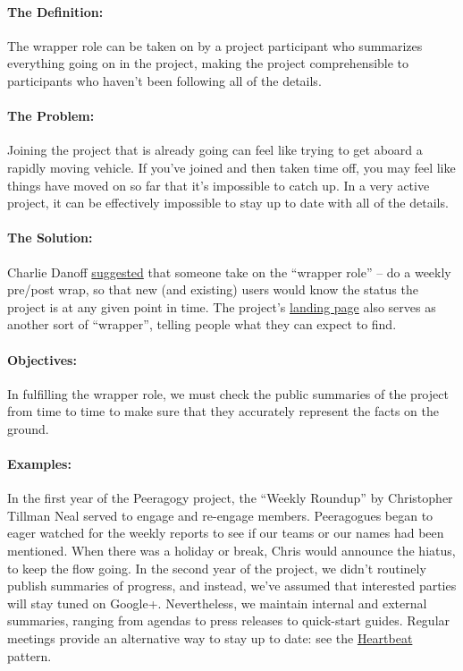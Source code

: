 \paragraph{The Definition:} The wrapper role can be taken on by a project
participant who summarizes everything going on in the project, making
the project comprehensible to participants who haven't been following
all of the details.

\paragraph{The Problem:} Joining the project that is already going can feel
like trying to get aboard a rapidly moving vehicle. If you've joined and
then taken time off, you may feel like things have moved on so far that
it's impossible to catch up. In a very active project, it can be
effectively impossible to stay up to date with all of the details.

\paragraph{The Solution:} Charlie
Danoff \href{http://socialmediaclassroom.com/host/peeragogy/wiki/rolesdivision-labor}{suggested}
that someone take on the ``wrapper role'' -- do a weekly pre/post wrap,
so that new (and existing) users would know the status the project is at
any given point in time. The
project's \href{http://socialmediaclassroom.com/host/peeragogy/}{landing
page} also serves as another sort of ``wrapper'', telling people what
they can expect to find.

\paragraph{Objectives:} In fulfilling the wrapper role, we must check the
public summaries of the project from time to time to make sure that they
accurately represent the facts on the ground.

\paragraph{Examples:} In the first year of the Peeragogy project, the
``Weekly Roundup'' by Christopher Tillman Neal served to engage and
re-engage members. Peeragogues began to eager watched for the weekly
reports to see if our teams or our names had been mentioned. When there
was a holiday or break, Chris would announce the hiatus, to keep the
flow going. In the second year of the project, we didn't routinely
publish summaries of progress, and instead, we've assumed that
interested parties will stay tuned on Google+. Nevertheless, we maintain
internal and external summaries, ranging from agendas to press releases
to quick-start guides. Regular meetings provide an alternative way to
stay up to date: see
the \href{http://peeragogy.org/patterns/heartbeat/}{Heartbeat} pattern.

